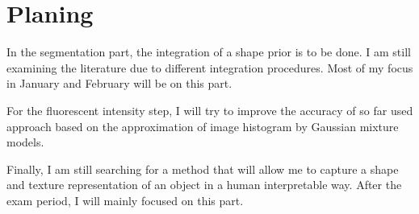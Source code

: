 
\chapter{Planing} %

\label{Chapter4} %



In the segmentation part, the integration of a shape prior is to be done. I am still examining the literature due to different integration procedures. Most of my focus in January and February will be on this part.

For the fluorescent intensity step, I will try to improve the accuracy of so far used approach based on the approximation of image histogram by Gaussian mixture models.

Finally, I am still searching for a method that will allow me to capture a shape and texture representation of an object in a human interpretable way. After the exam period, I will mainly focused on this part.
